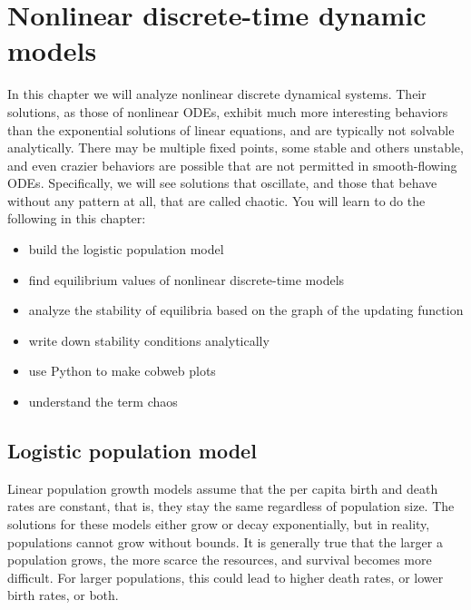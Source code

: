 \documentclass[
  letterpaper,
  DIV=11,
  numbers=noendperiod]{scrreprt}
\begin{document}

\hypertarget{nonlinear-discrete-time-dynamic-models}{%
\chapter{Nonlinear discrete-time dynamic
models}\label{nonlinear-discrete-time-dynamic-models}}

In this chapter we will analyze nonlinear discrete dynamical systems.
Their solutions, as those of nonlinear ODEs, exhibit much more
interesting behaviors than the exponential solutions of linear
equations, and are typically not solvable analytically. There may be
multiple fixed points, some stable and others unstable, and even crazier
behaviors are possible that are not permitted in smooth-flowing ODEs.
Specifically, we will see solutions that oscillate, and those that
behave without any pattern at all, that are called chaotic. You will
learn to do the following in this chapter:

\begin{itemize}
\item
  build the logistic population model
\item
  find equilibrium values of nonlinear discrete-time models
\item
  analyze the stability of equilibria based on the graph of the updating
  function
\item
  write down stability conditions analytically
\item
  use Python to make cobweb plots
\item
  understand the term chaos
\end{itemize}

\hypertarget{logistic-population-model}{%
\section{Logistic population model}\label{logistic-population-model}}

Linear population growth models assume that the per capita birth and
death rates are constant, that is, they stay the same regardless of
population size. The solutions for these models either grow or decay
exponentially, but in reality, populations cannot grow without bounds.
It is generally true that the larger a population grows, the more scarce
the resources, and survival becomes more difficult. For larger
populations, this could lead to higher death rates, or lower birth
rates, or both.
\end{document}
